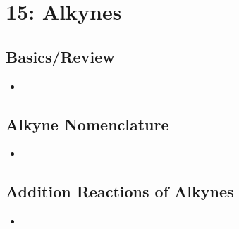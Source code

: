 \chapter{15: Alkynes}\label{15: Alkynes}
\section{Basics/Review}\label{Basics/Review}
\begin{itemize}
  \item 
\end{itemize}

\clearpage
\section{Alkyne Nomenclature}\label{Alkyne Nomenclature}
\begin{itemize}
    \item 
\end{itemize}

\clearpage
\section{Addition Reactions of Alkynes}\label{Addition Reactions of Alkynes}
\begin{itemize}
    \item 
\end{itemize}